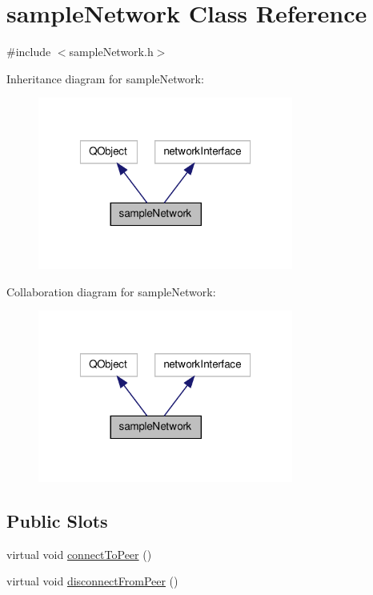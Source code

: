 \hypertarget{classsample_network}{\section{sample\+Network Class Reference}
\label{classsample_network}
}


{\ttfamily \#include $<$sample\+Network.\+h$>$}



Inheritance diagram for sample\+Network\+:\nopagebreak
\begin{figure}[H]
\begin{center}
\leavevmode
\includegraphics[width=238pt]{classsample_network__inherit__graph}
\end{center}
\end{figure}


Collaboration diagram for sample\+Network\+:\nopagebreak
\begin{figure}[H]
\begin{center}
\leavevmode
\includegraphics[width=238pt]{classsample_network__coll__graph}
\end{center}
\end{figure}
\subsection*{Public Slots}
\begin{DoxyCompactItemize}
\item 
virtual void \hyperlink{classsample_network_a5d7056c4114efdce6ea0e2c8f282f504}{connect\+To\+Peer} ()
\item 
virtual void \hyperlink{classsample_network_ac53b0506ff5dc44f3ab14ef8f5abe4d4}{disconnect\+From\+Peer} ()
\end{DoxyCompactItemize}
